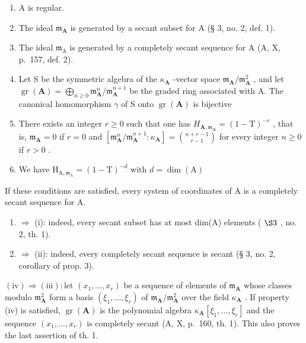 \begin{enumerate}
\def\labelenumi{(\roman{enumi})}
\item
  A is regular.
\item
  The ideal \(\mathfrak{m}_{\mathbf{A}}\) is generated by a secant subset for A (§ 3, no. 2, def. 1).
\item
  The ideal \(\mathfrak{m}_{\mathrm{A}}\) is generated by a completely secant sequence for A (A, X, p.~157, def. 2).
\item
  Let S be the symmetric algebra of the \(\kappa_{\mathbf{A}}\) -vector space \(\mathfrak{m}_{\mathbf{A}} / \mathfrak{m}_{\mathbf{A}}^{2}\) , and let \(\operatorname{gr}(\mathbf{A}) = \bigoplus_{n \geqslant 0} \mathfrak{m}_{\mathbf{A}}^{n} / \mathfrak{m}_{\mathbf{A}}^{n+1}\) be the graded ring associated with A. The canonical homomorphism \(\gamma\) of S onto \(\operatorname{gr}(\mathbf{A})\) is bijective
\item
  There exists an integer \(r \geqslant 0\) such that one has \(H_{\mathbf{A},\mathfrak{m}_{\mathbf{A}}} = (1 - \mathrm{T})^{-r}\) , that is, \(\mathfrak{m}_{\mathbf{A}} = 0\) if \(r = 0\) and \([\mathfrak{m}_{\mathbf{A}}^{n}/\mathfrak{m}_{\mathbf{A}}^{n+1}:\kappa_{\mathbf{A}}] = \binom{n + r - 1}{r - 1}\) for every integer \(n \geqslant 0\) if \(r > 0\) .
\item
  We have \(\mathrm{H}_{\mathrm{A},\mathfrak{m}_{\mathrm{A}}} = (1 - \mathrm{T})^{-d}\) with \(d = \dim (\mathrm{A})\)
\end{enumerate}

If these conditions are satisfied, every system of coordinates of A is a completely secant sequence for A.

\begin{enumerate}
\def\labelenumi{(\roman{enumi})}
\setcounter{enumi}{1}
\item
  \(\Rightarrow\) (i): indeed, every secant subset has at most dim(A) elements ( \(\S 3\) , no. 2, th. 1).
\item
  \(\Rightarrow\) (ii): indeed, every completely secant sequence is secant (§ 3, no. 2, corollary of prop. 3).
\end{enumerate}

\((\mathrm{iv}) \Rightarrow (\mathrm{iii}) : \text{let } (x_1, ..., x_r)\) be a sequence of elements of \(\mathfrak{m}_{\mathbf{A}}\) whose classes modulo \(\mathfrak{m}_{\mathbf{A}}^2\) form a basis \((\xi_1, ..., \xi_r)\) of \(\mathfrak{m}_{\mathbf{A}} / \mathfrak{m}_{\mathbf{A}}^2\) over the field \(\kappa_{\mathbf{A}}\) . If property (iv) is satisfied, \(\operatorname{gr}(\mathbf{A})\) is the polynomial algebra \(\kappa_{\mathbf{A}}[\xi_1, ..., \xi_r]\) and the sequence \((x_1, ..., x_r)\) is completely secant (A, X, p.~160, th. 1). This also proves the last assertion of th. 1.

